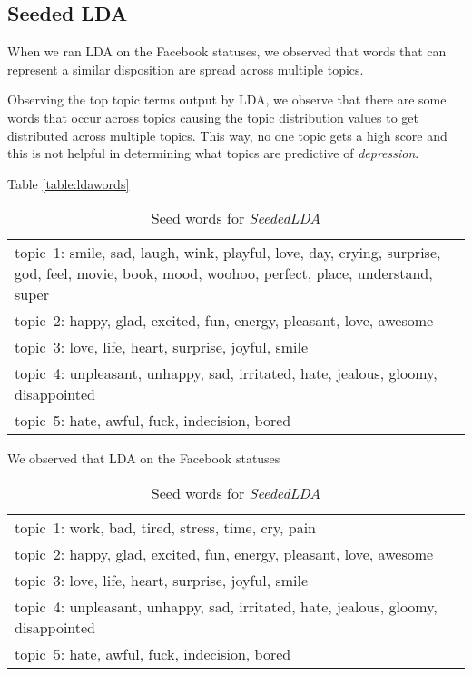 \subsection{Seeded LDA}
When we ran LDA on the Facebook statuses, we observed that words that can represent a similar disposition are spread across multiple topics.

Observing the top topic terms output by LDA, we observe that there are some words that occur across topics causing the topic distribution values to get distributed across multiple topics. This way, no one topic gets a high score and this is not helpful in determining what topics are predictive of \textit{depression}. 

Table \ref{table:ldawords} 

\begin{table*} [ht!]
	\begin{tabular}{ l }

{topic~1: smile, sad, laugh, wink, playful, love, day, crying, surprise, god, feel, movie, book, mood, woohoo, perfect, place, understand, super}\\
{topic~2: happy, glad, excited, fun, energy, pleasant, love, awesome}\\
{topic~3: love, life, heart, surprise, joyful, smile}\\
{topic~4: unpleasant, unhappy, sad, irritated, hate, jealous, gloomy, disappointed }\\
{topic~5: hate, awful, fuck, indecision, bored}\\

    \end{tabular}
      \caption{\noindent Seed words for \textit{SeededLDA}}
        \label{table:ldawords_1}
\end{table*}

We observed that LDA on the Facebook statuses
\begin{table*} [ht!]
	\begin{tabular}{ l }
{topic~1: work, bad, tired, stress, time, cry, pain}\\
{topic~2: happy, glad, excited, fun, energy, pleasant, love, awesome}\\
{topic~3: love, life, heart, surprise, joyful, smile}\\
{topic~4: unpleasant, unhappy, sad, irritated, hate, jealous, gloomy, disappointed }\\
{topic~5: hate, awful, fuck, indecision, bored}\\
    \end{tabular}
      \caption{\noindent Seed words for \textit{SeededLDA}}
        \label{table:seedwords_1}
\end{table*}

